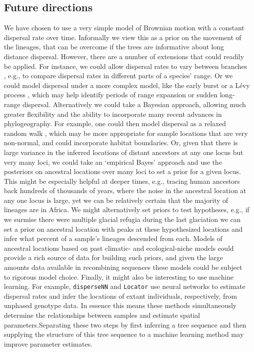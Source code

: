 \documentclass[12pt]{article}
\begin{document}
\subsection*{Future directions}

We have chosen to use a very simple model of Brownian motion with a constant dispersal rate over time. Informally we view this as a prior on the movement of the lineages, that can be overcome if the trees are informative about long distance dispersal. However, there are a number of extensions that could readily be applied. For instance, we could allow dispersal rates to vary between branches \citep{o2006testing}, e.g., to compare dispersal rates in different parts of a species' range. Or we could model dispersal under a more complex model, like the early burst \citep{harmon2010early} or a L{\'e}vy process \citep{landis2013phylogenetic}, which may help identify periods of range expansion or sudden long-range dispersal. Alternatively we could take a Bayesian approach, allowing much greater flexibility and the ability to incorporate many recent advances in phylogeography. For example, one could then model dispersal as a relaxed random walk \citep{lemey2010phylogeography}, which may be more appropriate for sample locations that are very non-normal, and could incorporate habitat boundaries. Or, given that there is large variance in the inferred locations of distant ancestors at any one locus \citep{schluter1997likelihood} but very many loci, we could take an `empirical Bayes' approach and use the posteriors on ancestral locations over many loci to set a prior for a given locus. This might be especially helpful at deeper times, e.g., tracing human ancestors back hundreds of thousands of years, where the noise in the ancestral location at any one locus is large, yet we can be relatively certain that the majority of lineages are in Africa. We might alternatively set priors to test hypotheses, e.g., if we surmise there were multiple glacial refugia during the last glaciation we can set a prior on ancestral location with peaks at these hypothesized locations and infer what percent of a sample's lineages descended from each. Models of ancestral locations based on past climatic- and ecological-niche models could provide a rich source of data for building such priors, and given the large amounts data available in recombining sequences these models could be subject to rigorous model choice. Finally, it might also be interesting to use machine learning. For example, \texttt{disperseNN} \citep{smith2023dispersal} and \texttt{Locator} \citep{battey2020predicting} use neural networks to estimate dispersal rates and infer the locations of extant individuals, respectively, from unphased genotype data. In essence this means these methods simultaneously determine the relationships between samples and estimate spatial parameters.Separating these two steps by first inferring a tree sequence and then supplying the structure of this tree sequence to a machine learning method  \citep{whitehouse2024tree} may improve parameter estimates.
\end{document}
